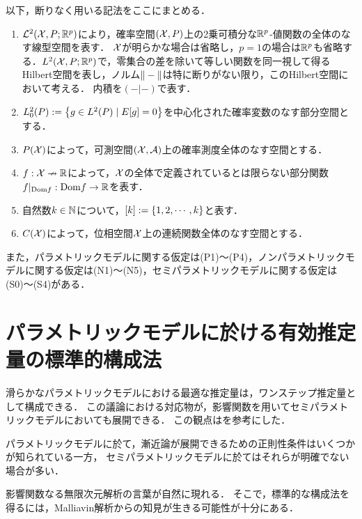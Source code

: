 \documentclass[uplatex, dvipdfmx]{jsarticle}
\begin{document}
\begin{notation}
    以下，断りなく用いる記法をここにまとめる．
    \begin{enumerate}
        \item $\mathcal{L}^2(\mathcal{X},P;\mathbb{R}^p)$により，確率空間$(\mathcal{X},P)$上の2乗可積分な$\mathbb{R}^p$-値関数の全体のなす線型空間を表す．
        $\mathcal{X}$が明らかな場合は省略し，$p=1$の場合は$\mathbb{R}^p$も省略する．$L^2(\mathcal{X},P;\mathbb{R}^p)$で，零集合の差を除いて等しい関数を同一視して得るHilbert空間を表し，ノルム$\|-\|$は特に断りがない限り，このHilbert空間において考える．
        内積を$(-|-)$で表す．
        \item $L^2_0(P):=\left\{g\in L^2(P)\mid E[g]=0\right\}$を中心化された確率変数のなす部分空間とする．
        \item $P(\mathcal{X})$によって，可測空間$(\mathcal{X},\mathcal{A})$上の確率測度全体のなす空間とする．
        \item $f:\mathcal{X}\nrightarrow\mathbb{R}$によって，$\mathcal{X}$の全体で定義されているとは限らない部分関数$f|_{\mathrm{Dom} f}:\mathrm{Dom} f\to\mathbb{R}$を表す．
        \item 自然数$k\in\mathbb{N}$について，$[k]:=\left\{1,2,\cdots,k\right\}$と表す．
        \item $C(\mathcal{X})$によって，位相空間$\mathcal{X}$上の連続関数全体のなす空間とする．
    \end{enumerate}
    また，パラメトリックモデルに関する仮定は(P1)〜(P4)，ノンパラメトリックモデルに関する仮定は(N1)〜(N5)，セミパラメトリックモデルに関する仮定は(S0)〜(S4)がある．
\end{notation}

\section{パラメトリックモデルに於ける有効推定量の標準的構成法}

\begin{tcolorbox}[colframe=ForestGreen, colback=ForestGreen!10!white,breakable,colbacktitle=ForestGreen!40!white,coltitle=black,fonttitle=\bfseries\sffamily,
title=]
    滑らかなパラメトリックモデルにおける最適な推定量は，ワンステップ推定量として構成できる．
    この議論における対応物が，影響関数を用いてセミパラメトリックモデルにおいても展開できる．
    この観点は\cite{Kennedy}を参考にした．

    パラメトリックモデルに於て，漸近論が展開できるための正則性条件はいくつかが知られている一方，
    セミパラメトリックモデルに於てはそれらが明確でない場合が多い．

    影響関数なる無限次元解析の言葉が自然に現れる．
    そこで，標準的な構成法を得るには，Malliavin解析からの知見が生きる可能性が十分にある．
\end{tcolorbox}
\end{document}
